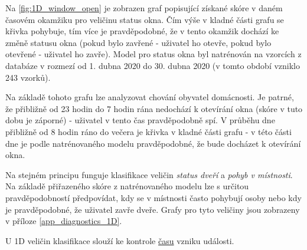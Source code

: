 Na \cref{fig:1D_window_open} je zobrazen graf popisující získané skóre v daném časovém okamžiku pro veličinu status okna. Čím výše v kladné části grafu se křivka pohybuje, tím více je pravděpodobné, že v tento okamžik dochází ke změně statusu okna (pokud bylo zavřené - uživatel ho otevře, pokud bylo otevřené - uživatel ho zavře). Model pro status okna byl natrénován na vzorcích z databáze v rozmezí od 1. dubna 2020 do 30. dubna 2020 (v tomto období vzniklo 243 vzorků). \par
Na základě tohoto grafu lze analyzovat chování obyvatel domácnosti. Je patrné, že přibližně od 23 hodin do 7 hodin rána nedochází k otevírání okna (skóre v tuto dobu je záporné) - uživatel v tento čas pravděpodobně spí. V průběhu dne přibližně od 8 hodin ráno do večera je křivka v kladné části grafu - v této části dne je podle natrénovaného modelu pravděpodobné, že bude docházet k otevírání okna. \par
Na stejném principu funguje klasifikace veličin \textit{status dveří} a \textit{pohyb v místnosti}. Na základě přiřazeného skóre z natrénovaného modelu lze s určitou pravděpodobností předpovídat, kdy se v místnosti často pohybují osoby nebo kdy je pravděpodobné, že uživatel zavře dveře. Grafy pro tyto veličiny jsou zobrazeny v příloze \ref{app_diagnostics_1D}. \par
U 1D veličin klasifikace slouží ke kontrole \underline{času} vzniku události.

